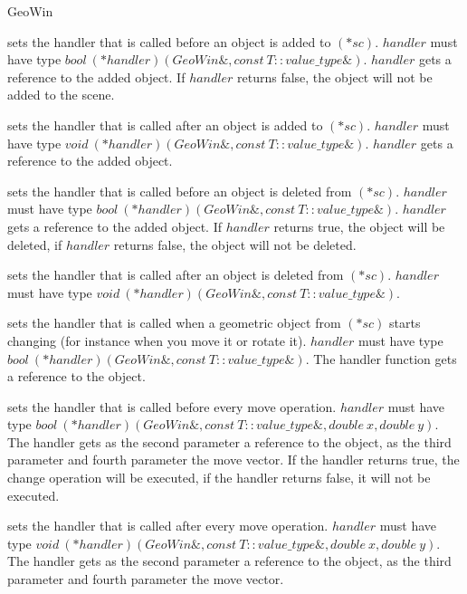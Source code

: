 \begin{ccRefClass}{GeoWin}
\begin{ccAdvanced}
{sets the handler that is called before an object is added to $(*sc)$.
$handler$ must have type $bool\ (*handler)(GeoWin\&, const\ T::value\_type \&)$.
$handler$ gets a reference to the added object. If $handler$ returns false, 
the object will not be added to the scene.}
  
{sets the handler that is called after an object is added to $(*sc)$. 
$handler$ must have type $void\ (*handler)(GeoWin\&, const\ T::value\_type \&)$.
$handler$ gets a reference to the added object.
}

{sets the handler that is called before an object is  deleted from $(*sc)$.
$handler$ must have type $bool\ (*handler)(GeoWin\&, const\ T::value\_type \&)$.
$handler$ gets a reference to the added object. If $handler$ returns true, the object
will be deleted, if $handler$ returns false, the object will not be deleted.}
  
{sets the handler that is called after an object is deleted from $(*sc)$.
$handler$ must have type $void\ (*handler)(GeoWin\&, const\ T::value\_type \&)$.
}

{sets the handler that is called when a geometric object from $(*sc)$ starts changing 
(for instance when you move it or rotate it).
$handler$ must have type $bool\ (*handler)(GeoWin\&, const\ T::value\_type \&)$.
The handler function gets a reference to the object.
}

{sets the handler that is called before every move operation.
$handler$ must have type $bool\ (*handler)(GeoWin\&, const\ T::value\_type \&, double\ x, double\ y)$. 
The handler gets as the second parameter a reference to the object, as the third parameter
and fourth parameter the move vector.
If the handler returns true, the change operation will be executed, if the handler
returns false, it will not be executed. 
}
  
{sets the handler that is called after every move operation.
$handler$ must have type $void\ (*handler)(GeoWin\&, const\ T::value\_type \&, double\ x, double\ y)$. 
The handler gets as the second parameter a reference to the object, as the third parameter
and fourth parameter the move vector.  
}
 

\end{ccAdvanced}
\end{ccRefClass}
